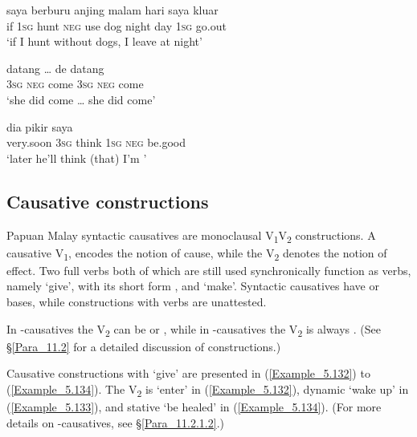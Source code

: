 \ea
\label{Example_5.129}
 {saya} {berburu} {} {} {anjing} {malam} {hari} {saya} {kluar}\\ %
 if  \textsc{1sg}  hunt  \textsc{neg}  use  dog  night  day  \textsc{1sg}  go.out\\
\glt 
‘if I hunt without  dogs, I leave at night’ \textstyleExampleSource{[080919-004-NP.0002]}
\z

\ea
\label{Example_5.130}
 {} {datang} {{\ldots}} {de} {} {datang}\\ %
 \textsc{3sg}  \textsc{neg}  come   { }  \textsc{3sg}  \textsc{neg}  come\\
\glt 
‘she did  come {\ldots} she did  come’ \textstyleExampleSource{[081010-001-Cv.0204-0205]}
\z

\ea
\label{Example_5.131}
 {dia} {pikir} {saya} {} {}\\ %
 very.soon  \textsc{3sg}  think  \textsc{1sg}  \textsc{neg}  be.good\\
\glt
‘later he’ll think (that) I’m ’ \textstyleExampleSource{[080919-004-NP.0052]}
\z


\subsection{Causative constructions}
\label{Para_5.3.7}
Papuan Malay syntactic causatives are monoclausal V\textsubscript{1}V\textsubscript{2} constructions. A caus\-ative  V\textsubscript{1}, encodes the notion of cause, while the V\textsubscript{2} denotes the notion of effect. Two full verbs both of which are still used synchronically function as  verbs, namely   ‘give’, with its short form , and   ‘make’. Syntactic causatives have  or  bases, while  constructions with  verbs are unattested.



In -causatives the V\textsubscript{2} can be  or , while in -causatives the V\textsubscript{2} is always . (See §\ref{Para_11.2} for a detailed discussion of  constructions.)



Causative constructions with  ‘give’ are presented in (\ref{Example_5.132}) to (\ref{Example_5.134}). The V\textsubscript{2} is   ‘enter’ in (\ref{Example_5.132}),  dynamic  ‘wake up’ in (\ref{Example_5.133}), and stative  ‘be healed’ in (\ref{Example_5.134}). (For more details on -causatives, see §\ref{Para_11.2.1.2}.)


